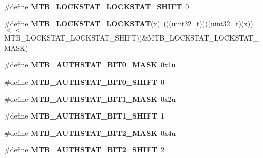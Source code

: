 \begin{DoxyCompactItemize}
\#define {\bfseries M\+T\+B\+\_\+\+L\+O\+C\+K\+S\+T\+A\+T\+\_\+\+L\+O\+C\+K\+S\+T\+A\+T\+\_\+\+S\+H\+I\+FT}~0
\item 
\mbox{\label{group___m_t_b___register___masks_ga7564897a50b19d58305ba8e6bb07cf14}} 
\#define {\bfseries M\+T\+B\+\_\+\+L\+O\+C\+K\+S\+T\+A\+T\+\_\+\+L\+O\+C\+K\+S\+T\+AT}(x)~(((uint32\+\_\+t)(((uint32\+\_\+t)(x))$<$$<$M\+T\+B\+\_\+\+L\+O\+C\+K\+S\+T\+A\+T\+\_\+\+L\+O\+C\+K\+S\+T\+A\+T\+\_\+\+S\+H\+I\+FT))\&M\+T\+B\+\_\+\+L\+O\+C\+K\+S\+T\+A\+T\+\_\+\+L\+O\+C\+K\+S\+T\+A\+T\+\_\+\+M\+A\+SK)
\item 
\mbox{\label{group___m_t_b___register___masks_gaa148665a7a3f112c47167991fefb5dbd}} 
\#define {\bfseries M\+T\+B\+\_\+\+A\+U\+T\+H\+S\+T\+A\+T\+\_\+\+B\+I\+T0\+\_\+\+M\+A\+SK}~0x1u
\item 
\mbox{\label{group___m_t_b___register___masks_ga0713a5495d348d4a4babb6bd55ad4827}} 
\#define {\bfseries M\+T\+B\+\_\+\+A\+U\+T\+H\+S\+T\+A\+T\+\_\+\+B\+I\+T0\+\_\+\+S\+H\+I\+FT}~0
\item 
\mbox{\label{group___m_t_b___register___masks_gaa036b217bc7db012d81f65d0c830d61e}} 
\#define {\bfseries M\+T\+B\+\_\+\+A\+U\+T\+H\+S\+T\+A\+T\+\_\+\+B\+I\+T1\+\_\+\+M\+A\+SK}~0x2u
\item 
\mbox{\label{group___m_t_b___register___masks_ga6be2635a6e4593e4321ed7be280cb1b9}} 
\#define {\bfseries M\+T\+B\+\_\+\+A\+U\+T\+H\+S\+T\+A\+T\+\_\+\+B\+I\+T1\+\_\+\+S\+H\+I\+FT}~1
\item 
\mbox{\label{group___m_t_b___register___masks_ga3821a5eaa059a41c5dd9d851ae1e5462}} 
\#define {\bfseries M\+T\+B\+\_\+\+A\+U\+T\+H\+S\+T\+A\+T\+\_\+\+B\+I\+T2\+\_\+\+M\+A\+SK}~0x4u
\item 
\mbox{\label{group___m_t_b___register___masks_gac75ef6d5ed3246bd912387fc3e43c2f5}} 
\#define {\bfseries M\+T\+B\+\_\+\+A\+U\+T\+H\+S\+T\+A\+T\+\_\+\+B\+I\+T2\+\_\+\+S\+H\+I\+FT}~2
\item 
\mbox{\label{group___m_t_b___register___masks_ga6e8d3b959fd40d42d3d5dc2fdec1803a}} 
$$
\end{DoxyCompactItemize}
